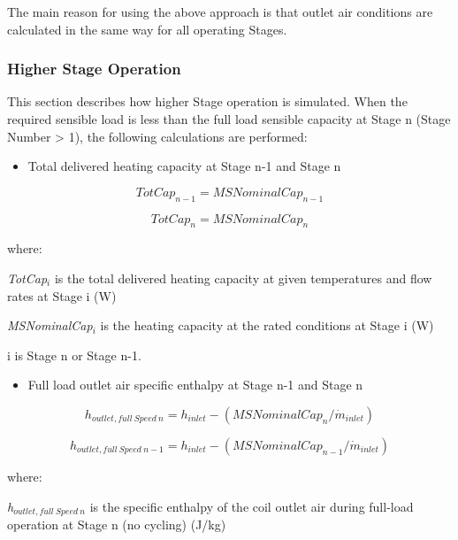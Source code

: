 The main reason for using the above approach is that outlet air conditions are calculated in the same way for all operating Stages.

\subsubsection{Higher Stage Operation}\label{higher-stage-operation}

This section describes how higher Stage operation is simulated. When the required sensible load is less than the full load sensible capacity at Stage n (Stage Number \textgreater{} 1), the following calculations are performed:

\begin{itemize}
  \item Total delivered heating capacity at Stage n-1 and Stage n
\end{itemize}

\begin{equation}
TotCa{p_{n - 1}} = MSNominalCa{p_{n - 1}}
\end{equation}

\begin{equation}
TotCa{p_n} = MSNominalCa{p_n}
\end{equation}

where:

\emph{TotCap\(_{i}\)} is the total delivered heating capacity at given temperatures and flow rates at Stage i (W)

\emph{MSNominalCap\(_{i}\)} is the heating capacity at the rated conditions at Stage i (W)

i is Stage n or Stage n-1.

\begin{itemize}
  \item Full load outlet air specific enthalpy at Stage n-1 and Stage n
\end{itemize}

\begin{equation}
{h_{outlet,full~Speed~n}} = {h_{inlet}} - (MSNominalCa{p_n}/{\dot{m}_{inlet}})
\end{equation}

\begin{equation}
{h_{outlet,full~Speed~n-1}} = {h_{inlet}} - (MSNominalCa{p_{n - 1}}/{\dot{m}_{inlet}})
\end{equation}

where:

\emph{h\(_{outlet,full~Speed~n}\)} is the specific enthalpy of the coil outlet air during full-load operation at Stage n (no cycling) (J/kg)

